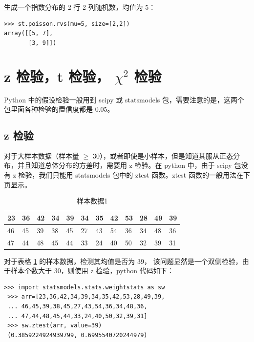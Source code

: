 生成一个指数分布的 2 行 2 列随机数，均值为 5：

\begin{lstlisting}[Language=Python]
>>> st.poisson.rvs(mu=5, size=[2,2])
array([[5, 7],
       [3, 9]])
\end{lstlisting}

\section{z 检验，t 检验， $\chi^2$ 检验}

 Python 中的假设检验一般用到 scipy 或 statsmodels 包，需要注意的是，这两个包里面各种检验的置信度都是 0.05。

\subsection{z 检验}

 对于大样本数据（样本量 $\geq$ 30），或者即使是小样本，但是知道其服从正态分布，并且知道总体分布的方差时，需要用 z 检验。在 python 中，由于 scipy 包没有 z 检验，我们只能用 statsmodels 包中的 ztest 函数。ztest 函数的一般用法在下页显示。

 \begin{table}[ht]
 \centering
 \caption{样本数据1} \label{tab:ztest}
 \begin{tabular}{|l|l|l|l|l|l|l|l|l|l|l|l|}
 \hline

 23 & 36 & 42 & 34 & 39 & 34 & 35 & 42 & 53 & 28 & 49 & 39 \\ \hline
 46 & 45 & 39 & 38 & 45 & 27 & 43 & 54 & 36 & 34 & 48 & 36 \\ \hline
 47 & 44 & 48 & 45 & 44 & 33 & 24 & 40 & 50 & 32 & 39 & 31 \\ \hline

 \end{tabular}
 \end{table}

 对于表格 \ref{tab:ztest} 的样本数据，检测其均值是否为 39， 该问题显然是一个双侧检验，由于样本个数大于 30，则使用 z 检验，python 代码如下：

 \begin{lstlisting}[Language=Python]
 >>> import statsmodels.stats.weightstats as sw
 >>> arr=[23,36,42,34,39,34,35,42,53,28,49,39,
 ... 46,45,39,38,45,27,43,54,36,34,48,36,
 ... 47,44,48,45,44,33,24,40,50,32,39,31]
 >>> sw.ztest(arr, value=39)
 (0.3859224924939799, 0.6995540720244979)
 \end{lstlisting}

